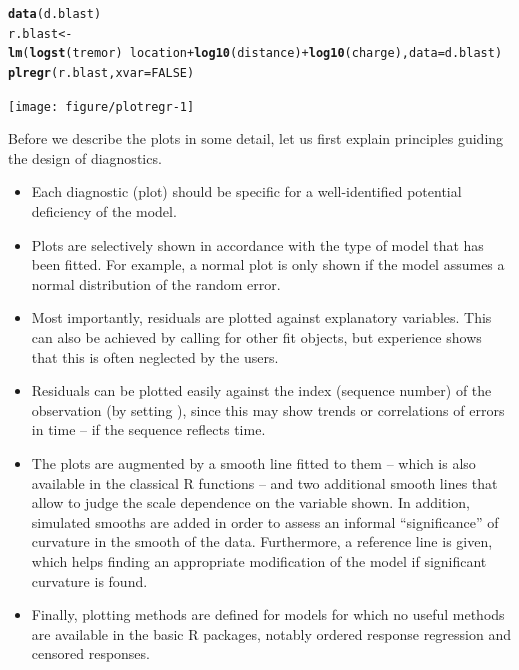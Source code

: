 \documentclass[11pt]{article}\usepackage[]{graphicx}\usepackage[]{color}
\makeatletter
\newcommand{\hlnum}[1]{\textcolor[rgb]{0.686,0.059,0.569}{#1}}%
\newcommand{\hlopt}[1]{\textcolor[rgb]{0,0,0}{#1}}%
\newcommand{\hlstd}[1]{\textcolor[rgb]{0.345,0.345,0.345}{#1}}%
\newcommand{\hlkwb}[1]{\textcolor[rgb]{0.69,0.353,0.396}{#1}}%
\newcommand{\hlkwc}[1]{\textcolor[rgb]{0.333,0.667,0.333}{#1}}%
\newcommand{\hlkwd}[1]{\textcolor[rgb]{0.737,0.353,0.396}{\textbf{#1}}}%
\newenvironment{kframe}{%
 \def\at@end@of@kframe{}%
 \ifinner\ifhmode%
  \def\at@end@of@kframe{\end{minipage}}%
  \begin{minipage}{\columnwidth}%
 \fi\fi%
 \def\FrameCommand##1{\hskip\@totalleftmargin \hskip-\fboxsep
 \colorbox{shadecolor}{##1}\hskip-\fboxsep
     \hskip-\linewidth \hskip-\@totalleftmargin \hskip\columnwidth}%
 \MakeFramed {\advance\hsize-\width
   \@totalleftmargin\z@ \linewidth\hsize
   \@setminipage}}%
 {\par\unskip\endMakeFramed%
 \at@end@of@kframe}
\newenvironment{knitrout}{}{} %
\makeatother
\begin{document}
\begin{knitrout}
\color{fgcolor}\begin{kframe}
\begin{alltt}
\hlkwd{data}\hlstd{(d.blast)}
\hlstd{r.blast} \hlkwb{<-}
  \hlkwd{lm}\hlstd{(}\hlkwd{logst}\hlstd{(tremor)}\hlopt{~}\hlstd{location}\hlopt{+}\hlkwd{log10}\hlstd{(distance)}\hlopt{+}\hlkwd{log10}\hlstd{(charge),} \hlkwc{data}\hlstd{=d.blast)}
\hlkwd{plregr}\hlstd{(r.blast,} \hlkwc{xvar}\hlstd{=}\hlnum{FALSE}\hlstd{)}
\end{alltt}
\end{kframe}
\texttt{[image: figure/plotregr-1]} 

\end{knitrout}
Before we describe the plots in some detail, let us first explain  
principles guiding the design of diagnostics.
\begin{itemize}
\item
Each diagnostic (plot) should be specific for a well-identified potential 
deficiency of the model.
\item
Plots are selectively shown in accordance with the type of model that has 
been fitted. For example, a normal plot is only shown if the model assumes
a normal distribution of the random error.
\item
Most importantly, residuals are plotted against explanatory variables.
This can also be achieved by calling  for other fit objects,  
but experience shows that this is often neglected by the users.
\item
Residuals can be plotted easily against the index (sequence number) 
of the observation (by setting ), 
since this may show trends or correlations of errors in time --
if the sequence reflects time.
\item
The plots are augmented by a smooth line fitted to them -- which is also
available in the classical R functions -- and two additional smooth lines
that allow to judge the scale dependence on the variable shown.
In addition, simulated smooths are added in order to assess an informal 
``significance'' of curvature in the smooth of the data. 
Furthermore, a reference line is given, which helps finding
an appropriate modification of the model if significant curvature is
found. 
\item
Finally, plotting methods are defined for models for which no useful 
methods are available in the basic R packages, notably ordered response
regression and censored responses.
\end{itemize}
\end{document}
